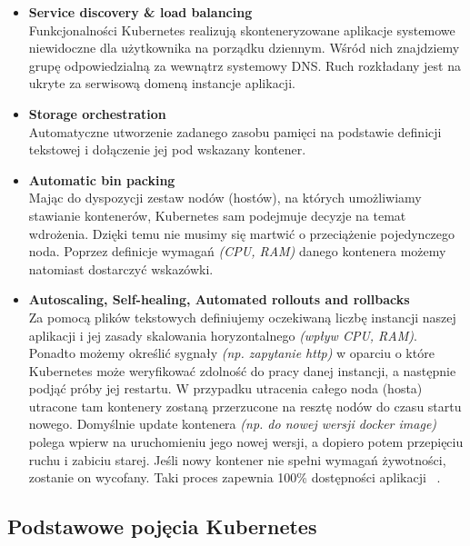 \begin{itemize}
    \item
    \textbf{Service discovery \& load balancing}\\
    Funkcjonalności Kubernetes realizują skonteneryzowane aplikacje systemowe niewidoczne dla użytkownika na porządku dziennym.
    Wśród nich znajdziemy grupę odpowiedzialną za wewnątrz systemowy DNS. Ruch rozkładany jest na ukryte za serwisową domeną instancje aplikacji. 
    
    \item
    \textbf{Storage orchestration}\\
    Automatyczne utworzenie zadanego zasobu pamięci na podstawie definicji tekstowej i dołączenie jej pod wskazany kontener.

    \item
    \textbf{Automatic bin packing}\\
    \label{bin-packing}
    Mając do dyspozycji zestaw nodów (hostów), na których umożliwiamy stawianie kontenerów, Kubernetes sam podejmuje decyzje na temat wdrożenia.
    Dzięki temu nie musimy się martwić o przeciążenie pojedynczego noda.
    Poprzez definicje wymagań \emph{(CPU, RAM)} danego kontenera możemy natomiast dostarczyć wskazówki. 

    \item
    \textbf{Autoscaling, Self-healing, Automated rollouts and rollbacks}\\
    Za pomocą plików tekstowych definiujemy oczekiwaną liczbę instancji naszej aplikacji i jej zasady skalowania horyzontalnego \emph{(wpływ CPU, RAM)}.
    Ponadto możemy określić sygnały \emph{(np. zapytanie http)} w oparciu o które Kubernetes może weryfikować zdolność do pracy danej instancji, a następnie podjąć próby jej restartu.
    W przypadku utracenia całego noda (hosta) utracone tam kontenery zostaną przerzucone na resztę nodów do czasu startu nowego.
    Domyślnie update kontenera \emph{(np. do nowej wersji docker image)} polega wpierw na uruchomieniu jego nowej wersji, a dopiero potem przepięciu ruchu i zabiciu starej.
    Jeśli nowy kontener nie spełni wymagań żywotności, zostanie on wycofany. Taki proces zapewnia 100\% dostępności aplikacji ~\cite{k8s-what}.
\end{itemize} 

\subsection{Podstawowe pojęcia Kubernetes}

